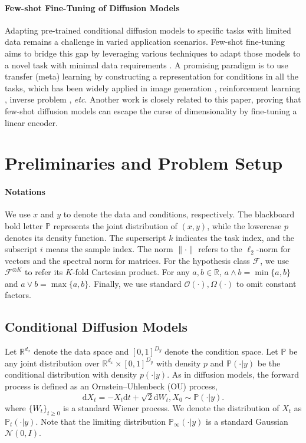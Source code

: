 \documentclass{article}
\numberwithin{equation}{section}
\newcommand{\R}{\mathbb{R}}
\newcommand{\dif}{\mathrm{d}}
\theoremstyle{definition}
\renewcommand{\P}{\mathbb{P}}
\begin{document}
\paragraph{Few-shot Fine-Tuning of Diffusion Models}

Adapting pre-trained conditional diffusion models to specific tasks with limited data remains a challenge in varied application scenarios.
Few-shot fine-tuning aims to bridge this gap by leveraging various techniques to adapt those models to a novel task with minimal data requirements \citep{ruiz2023dreambooth,giannone2022few}.
A promising paradigm is to use transfer (meta) learning by constructing a representation for conditions in all the tasks, which has been widely applied in image generation \citep{rombach2022high,ramesh2022hierarchical,sinha2021d2c}, reinforcement learning \citep{he2023diffusion,ni2023metadiffuser}, inverse problem \citep{tewari2023diffusion,chung2023solving}, \textit{etc}.
Another work \citet{yang2024fewshot} is closely related to this paper, proving that few-shot diffusion models can escape the curse of dimensionality by fine-tuning a linear encoder.  


\section{Preliminaries and Problem Setup}

\paragraph{Notations}
We use $x$ and $y$ to denote the data and conditions, respectively.
The blackboard bold letter $\P$ represents the joint distribution of $(x,y)$, while the lowercase $p$ denotes its density function.
The superscript $k$ indicates the task index, and the subscript $i$ means the sample index.
The norm $\|\cdot\|$ refers to the $\ell_2$-norm  for vectors and the spectral norm for matrices.
For the hypothesis class $\mathcal{F}$, we
use $\mathcal{F}^{\otimes K}$ to refer its $K$-fold Cartesian product.
For any $a,b\in\R$, $a\wedge b=\min\{a,b\}$ and $a\vee b=\max\{a,b\}$.
Finally, we use standard $\mathcal{O}(\cdot), \Omega(\cdot)$ to omit constant
factors.

\subsection{Conditional Diffusion Models}

Let $\R^{d_x}$ denote the data space and $[0,1]^{D_y}$ denote the condition space.
Let $\P$ be any joint distribution over $\R^{d_x}\times[0,1]^{D_y}$ with density $p$ and $\P(\cdot|y)$ be the conditional distribution with density $p(\cdot|y)$.
As in diffusion models, the forward process is defined as an Ornstein–Uhlenbeck (OU) process,
\begin{equation}\label{eq:ou_process}
    \dif X_t = -X_t\dif t + \sqrt{2}\dif W_t, X_0\sim \P(\cdot|y).
\end{equation}
where $\{W_t\}_{t\geq 0}$ is a standard Wiener process. We denote the distribution of $X_t$ as $\P_t(\cdot|y)$.
Note that the limiting distribution $\P_\infty(\cdot|y)$ is a standard Gaussian $\mathcal{N}(0,I)$.
\end{document}
